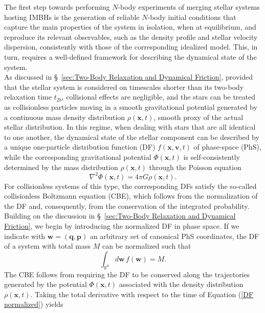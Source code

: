 \documentclass[12pt,twoside,openany]{book}
\begin{document}
The first step towards performing $N$-body experiments of merging stellar systems hosting IMBHs is the generation of reliable $N$-body initial conditions that capture the main properties of the system in isolation, when at equilibrium, and reproduce its relevant observables, such as the density profile and stellar velocity dispersion, consistently with those of the corresponding idealized model. This, in turn, requires a well-defined framework for describing the dynamical state of the system.\\As discussed in \S~\ref{sec:Two-Body Relaxation and Dynamical Friction}, provided that the stellar system is considered on timescales shorter than its two-body relaxation time $t_{2b}$, collisional effects are negligible, and the stars can be treated as collisionless particles moving in a smooth gravitational potential generated by a continuous mass density distribution $\rho(\mathbf{x},t)$, smooth proxy of the actual stellar distribution. In this regime, when dealing with stars that are all identical to one another, the dynamical state of the stellar component can be described by a unique one-particle distribution function (DF) $f(\mathbf{x},\mathbf{v},t)$ of phase-space (PhS), while the corresponding gravitational potential $\Phi(\mathbf{x},t)$ is self-consistently determined by the mass distribution $\rho(\mathbf{x},t)$ through the Poisson equation
\begin{equation}
\label{Poisson equation}
 \nabla^2 \Phi(\mathbf{x},t)=4\pi G\rho(\mathbf{x},t).
\end{equation}
For collisionless systems of this type, the corresponding DFs satisfy the so-called collisionless Boltzmann equation (CBE), which follows from the normalization of the DF and, consequently, from the conservation of the integrated probability.\\Building on the discussion  in \S~\ref{sec:Two-Body Relaxation and Dynamical Friction}, we begin by introducing the normalized DF in phase space. If we indicate with $\mathbf{w}=(\mathbf{q},\mathbf{p})$ an arbitrary set of canonical PhS coordinates, the DF of a system with total mass $M$ can be normalized such that
\begin{equation}\label{DF normalized}
\int_{\mathbb{R}^6}d\mathbf{w}\, f(\mathbf{w})=M.
\end{equation}
The CBE follows from requiring the DF to be conserved along the trajectories generated by the potential $\Phi(\mathbf{x},t)$ associated with the density distribution $\rho(\mathbf{x},t)$. Taking the total derivative with respect to the time of Equation (\ref{DF normalized}) yields
\end{document}
